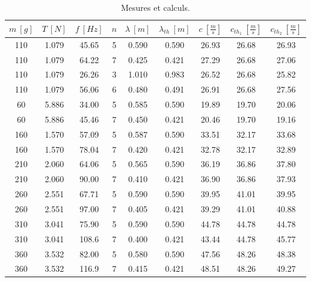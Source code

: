 \documentclass[11pt]{article}
\begin{document}
    \begin{table}[H]
    \centering
        \begin{tabular}{|c|c||c|c||c|c||c|c|c|}
            \hline
            \rowcolor{gray} $m \ [g]$ & $T \ [N]$ & $f \ [Hz]$ & $n$ & $\lambda \ [m]$ & $\lambda_{th} \ [m]$ & $c \ \left[\frac{m}{s}\right]$ & $c_{th_1} \ \left[\frac{m}{s}\right]$ & $c_{th_2} \ \left[\frac{m}{s}\right]$ \\
            \hline
            110 & 1.079 & 45.65 & 5 & 0.590 & 0.590 & 26.93 & 26.68 & 26.93 \\
            \hline
            110 & 1.079 & 64.22 & 7 & 0.425 & 0.421 & 27.29 & 26.68 & 27.06 \\
            \hline
            110 & 1.079 & 26.26 & 3 & 1.010 & 0.983 & 26.52 & 26.68 & 25.82 \\
            \hline
            110 & 1.079 & 56.06 & 6 & 0.480 & 0.491 & 26.91 & 26.68 & 27.56 \\
            \hline
            60 & 5.886 & 34.00 & 5 & 0.585 & 0.590 & 19.89 & 19.70 & 20.06 \\
            \hline
            60 & 5.886 & 45.46 & 7 & 0.450 & 0.421 & 20.46 & 19.70 & 19.16 \\
            \hline
            160 & 1.570 & 57.09 & 5 & 0.587 & 0.590 & 33.51 & 32.17 & 33.68 \\
            \hline
            160 & 1.570 & 78.04 & 7 & 0.420 & 0.421 & 32.78 & 32.17 & 32.89 \\
            \hline
            210 & 2.060 & 64.06 & 5 & 0.565 & 0.590 & 36.19 & 36.86 & 37.80 \\
            \hline
            210 & 2.060 & 90.00 & 7 & 0.410 & 0.421 & 36.90 & 36.86 & 37.93 \\
            \hline
            260 & 2.551 & 67.71 & 5 & 0.590 & 0.590 & 39.95 & 41.01 & 39.95 \\
            \hline
            260 & 2.551 & 97.00 & 7 & 0.405 & 0.421 & 39.29 & 41.01 & 40.88 \\
            \hline
            310 & 3.041 & 75.90 & 5 & 0.590 & 0.590 & 44.78 & 44.78 & 44.78 \\
            \hline
            310 & 3.041 & 108.6 & 7 & 0.400 & 0.421 & 43.44 & 44.78 & 45.77 \\
            \hline
            360 & 3.532 & 82.00 & 5 & 0.580 & 0.590 & 47.56 & 48.26 & 48.38 \\
            \hline
            360 & 3.532 & 116.9 & 7 & 0.415 & 0.421 & 48.51 & 48.26 & 49.27 \\
            \hline
        \end{tabular}
        \caption{Mesures et calculs.}
        \label{tab:mesure}
    \end{table}
\end{document}
